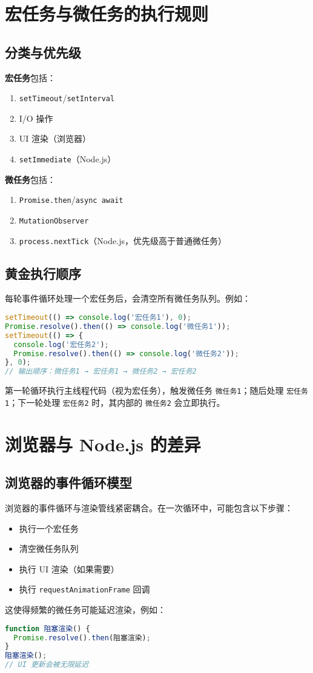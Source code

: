 \chapter{宏任务与微任务的执行规则}
\section{分类与优先级}
\textbf{宏任务}包括：\par
\begin{enumerate}
\item \verb!setTimeout!/\verb!setInterval!
\item I/O 操作
\item UI 渲染（浏览器）
\item \verb!setImmediate!（Node.js）
\end{enumerate}
\textbf{微任务}包括：\par
\begin{enumerate}
\item \verb!Promise.then!/\verb!async await!
\item \verb!MutationObserver!
\item \verb!process.nextTick!（Node.js，优先级高于普通微任务）
\end{enumerate}
\section{黄金执行顺序}
每轮事件循环处理一个宏任务后，会清空所有微任务队列。例如：\par
\begin{lstlisting}[language=javascript]
setTimeout(() => console.log('宏任务1'), 0);
Promise.resolve().then(() => console.log('微任务1'));
setTimeout(() => {
  console.log('宏任务2');
  Promise.resolve().then(() => console.log('微任务2'));
}, 0);
// 输出顺序：微任务1 → 宏任务1 → 微任务2 → 宏任务2
\end{lstlisting}
第一轮循环执行主线程代码（视为宏任务），触发微任务 \verb!微任务1!；随后处理 \verb!宏任务1!；下一轮处理 \verb!宏任务2! 时，其内部的 \verb!微任务2! 会立即执行。\par
\chapter{浏览器与 Node.js 的差异}
\section{浏览器的事件循环模型}
浏览器的事件循环与渲染管线紧密耦合。在一次循环中，可能包含以下步骤：\par
\begin{itemize}
\item 执行一个宏任务
\item 清空微任务队列
\item 执行 UI 渲染（如果需要）
\item 执行 \verb!requestAnimationFrame! 回调
\end{itemize}
这使得频繁的微任务可能延迟渲染，例如：\par
\begin{lstlisting}[language=javascript]
function 阻塞渲染() {
  Promise.resolve().then(阻塞渲染);
}
阻塞渲染();
// UI 更新会被无限延迟
\end{lstlisting}
